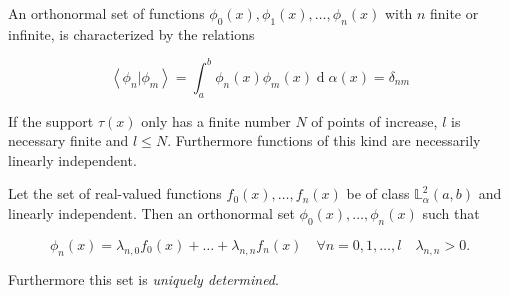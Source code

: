 \documentclass{article}
\DeclareMathOperator{\diff}{d}
\newcommand{\innerp}[2]{\left\langle #1 \vert #2 \right\rangle}
\begin{document}
\begin{definition}[label=18x0c7vo, name=Orthogonal Polynomials]
	An orthonormal set of functions \( \phi_0(x), \phi_1(x), \dots,
	\phi_n(x) \) with \( n \) finite or infinite, is characterized by the
	relations

	\[
		\innerp{\phi_n}{\phi_m} =
		\int_a^b\phi_n(x)\phi_m(x)\diff\alpha(x) = \delta_{nm}
	\]

	If the support \( \tau(x) \) only has a finite number \( N \) of points
	of increase, \( l \) is necessary finite and \( l \leq N \). Furthermore
	functions of this kind are necessarily linearly independent.

	\begin{theorem}[label=g__9ue2i, name=Reparametrization]
		Let the set of real-valued functions \( f_0(x), \dots, f_n(x) \)
		be of class \( \mathbb{L}_\alpha^2(a,b) \) and linearly
		independent. Then an orthonormal set \( \phi_0(x), \dots,
		\phi_n(x)\) such that 

		\[
			\phi_n(x) = \lambda_{n,0}f_0(x) + \dots +
			\lambda_{n,n}f_n(x)\quad\forall
			n=0,1,\dots,l\quad\lambda_{n,n} > 0.
		\]

		Furthermore this set is \emph{uniquely determined}.
	\end{theorem}

\end{definition}
\end{document}
